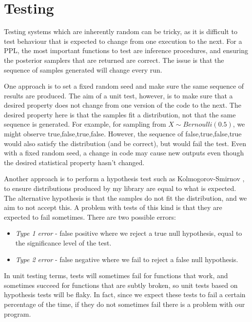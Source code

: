 				
\section{Testing}\label{sec:impl-testing}
			
Testing systems which are inherently random can be tricky, as it is difficult to test behaviour that is expected to change from one execution to the next. For a PPL, the most important functions to test are inference procedures, and ensuring the posterior samplers that are returned are correct. The issue is that the sequence of samples generated will change every run.
			
One approach is to set a fixed random seed and make sure the same sequence of results are produced. The aim of a unit test, however, is to make sure that a desired property does not change from one version of the code to the next. The desired property here is that the samples fit a distribution, not that the same sequence is generated. For example, for sampling from $X \sim Bernoulli(0.5)$, we might observe true,false,true,false. However, the sequence of false,true,false,true would also satisfy the distribution (and be correct), but would fail the test. Even with a fixed random seed, a change in code may cause new outputs even though the desired statistical property hasn't changed.
			
Another approach is to perform a hypothesis test such as Kolmogorov-Smirnov \cite{massey1951kolmogorov}, to ensure distributions produced by my library are equal to what is expected. The alternative hypothesis is that the samples do not fit the distribution, and we aim to not accept this. A problem with tests of this kind is that they are expected to fail sometimes. There are two possible errors:
\begin{itemize}
	\item \textit{Type 1 error} - false positive where we reject a true null hypothesis, equal to the significance level of the test.
	\item \textit{Type 2 error} - false negative where we fail to reject a false null hypothesis.
\end{itemize}
In unit testing terms, tests will sometimes fail for functions that work, and sometimes succeed for functions that are subtly broken, so unit tests based on hypothesis tests will be flaky. In fact, since we expect these tests to fail a certain percentage of the time, if they do not sometimes fail there is a problem with our program.
			
